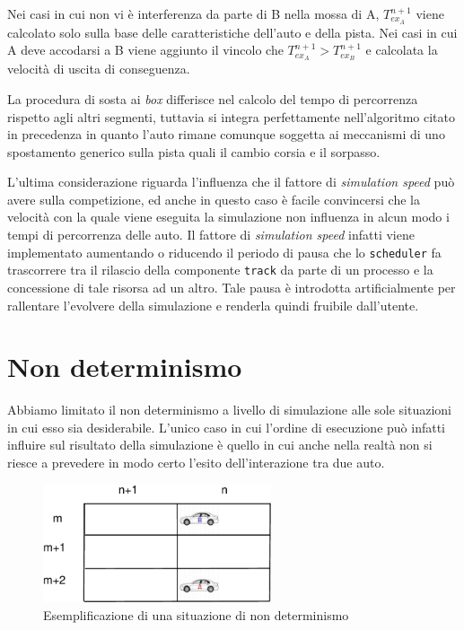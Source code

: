 Nei casi in cui non vi è interferenza da parte di B nella mossa di A, $T_{ex_A}^{n+1}$ viene calcolato solo sulla base delle caratteristiche dell'auto e della pista.
Nei casi in cui A deve accodarsi a B viene aggiunto il vincolo che $T_{ex_A}^{n+1} > T_{ex_B}^{n+1}$ e calcolata la velocità di uscita di conseguenza.

La procedura di sosta ai \textit{box} differisce nel calcolo del tempo di percorrenza rispetto agli altri segmenti, tuttavia si integra perfettamente nell'algoritmo citato in precedenza in quanto l'auto rimane comunque soggetta ai meccanismi di uno spostamento generico sulla pista quali il cambio corsia e il sorpasso.


L'ultima considerazione riguarda l'influenza che il fattore di \textit{simulation speed} può avere sulla competizione, ed anche in questo caso è facile convincersi che la velocità con la quale viene eseguita la simulazione non influenza in alcun modo i tempi di percorrenza delle auto. Il fattore di \textit{simulation speed} infatti viene implementato aumentando o riducendo il periodo di pausa che lo \texttt{scheduler} fa trascorrere tra il rilascio della componente \texttt{track} da parte di un processo e la concessione di tale risorsa ad un altro. Tale pausa è introdotta artificialmente per rallentare l'evolvere della simulazione e renderla quindi fruibile dall'utente.

\section{Non determinismo}
Abbiamo limitato il non determinismo a livello di simulazione alle sole situazioni in cui esso sia desiderabile. L'unico caso in cui l'ordine di esecuzione può infatti influire sul risultato della simulazione è quello in cui anche nella realtà non si riesce a prevedere in modo certo l'esito dell'interazione tra due auto.

\begin{figure}
\begin{center}
\includegraphics[width=0.6\textwidth]{diagrammi/NonDet}
\caption{Esemplificazione di una situazione di non determinismo}
\label{fig:nonDet}
\end{center}
\end{figure}

